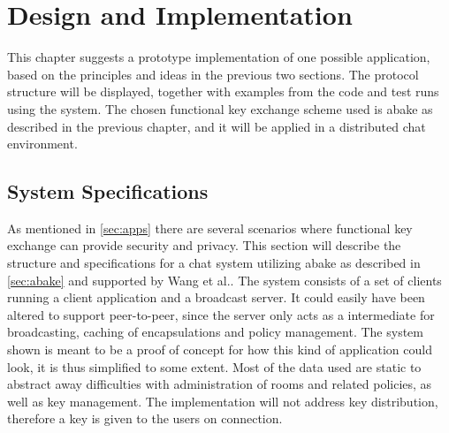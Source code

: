 \chapter{Design and Implementation}\label{chp:designimpl}
This chapter suggests a prototype implementation of one possible application, based on the principles and ideas in the previous two sections. The protocol structure will be displayed, together with examples from the code and test runs using the system. The chosen functional key exchange scheme used is \gls{abake} as described in the previous chapter, and it will be applied in a distributed chat environment. 

\section{System Specifications}\label{sec:chat}
As mentioned in \ref{sec:apps} there are several scenarios where functional key exchange can provide security and privacy. This section will describe the structure and specifications for a chat system utilizing \gls{abake} as described in \ref{sec:abake} and  supported by Wang et al.\cite{DBLP:abake}. The system consists of a set of clients running a client application and a broadcast server. It could easily have been altered to support peer-to-peer, since the server only acts as a intermediate for broadcasting, caching of encapsulations and policy management. The system shown is meant to be a proof of concept for how this kind of application could look, it is thus simplified to some extent. Most of the data used are static to abstract away difficulties with administration of rooms and related policies, as well as key management. The implementation will not address key distribution, therefore a key is given to the users on connection. 




